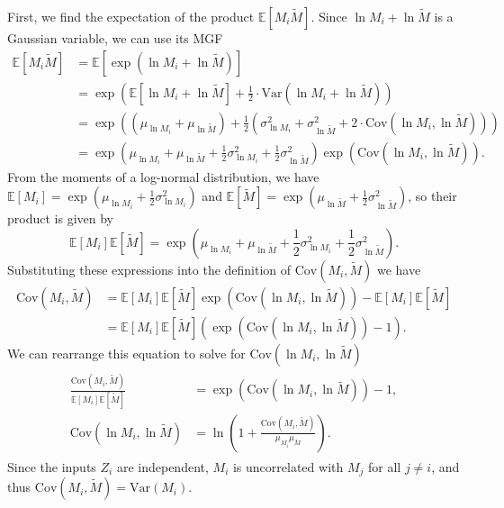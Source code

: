 \documentclass{uai2026} %
\begin{document}
First, we find the expectation of the product $\mathbb{E}[M_i \tilde{M}]$. Since $\ln M_i + \ln \tilde{M}$ is a Gaussian variable, we can use its MGF
\begin{align*}
\mathbb{E}[M_i \tilde{M}] &= \mathbb{E}[\exp(\ln M_i + \ln \tilde{M})] \\
&= \exp\left(\mathbb{E}[\ln M_i + \ln \tilde{M}] + \frac{1}{2} \cdot \text{Var}(\ln M_i + \ln \tilde{M})\right) \\
&= \exp\left((\mu_{\ln M_i} + \mu_{\ln \tilde{M}}) + \frac{1}{2}(\sigma_{\ln M_i}^2 + \sigma_{\ln \tilde{M}}^2 + 2\cdot \text{Cov}(\ln M_i, \ln \tilde{M}))\right) \\
&= \exp\left(\mu_{\ln M_i} + \mu_{\ln \tilde{M}} + \frac{1}{2}\sigma_{\ln M_i}^2 + \frac{1}{2}\sigma_{\ln \tilde{M}}^2\right) \exp\left(\text{Cov}(\ln M_i, \ln \tilde{M})\right).
\end{align*}
From the moments of a log-normal distribution, we have $\mathbb{E}[M_i] = \exp(\mu_{\ln M_i} + \frac{1}{2}\sigma_{\ln M_i}^2)$ and $\mathbb{E}[\tilde{M}] = \exp(\mu_{\ln \tilde{M}} + \frac{1}{2}\sigma_{\ln \tilde{M}}^2)$, so their product is given by
$$
\mathbb{E}[M_i]\mathbb{E}[\tilde{M}] = \exp\left(\mu_{\ln M_i} + \mu_{\ln \tilde{M}} + \frac{1}{2}\sigma_{\ln M_i}^2 + \frac{1}{2}\sigma_{\ln \tilde{M}}^2\right).
$$
Substituting these expressions into the definition of $\text{Cov}(M_i, \tilde{M})$ we have
\begin{align*}
\text{Cov}(M_i, \tilde{M}) &= \mathbb{E}[M_i]\mathbb{E}[\tilde{M}] \exp\left(\text{Cov}(\ln M_i, \ln \tilde{M})\right) - \mathbb{E}[M_i]\mathbb{E}[\tilde{M}] \\
&= \mathbb{E}[M_i]\mathbb{E}[\tilde{M}] \left(\exp(\text{Cov}(\ln M_i, \ln \tilde{M})) - 1\right).
\end{align*}
We can rearrange this equation to solve for $\text{Cov}(\ln M_i, \ln \tilde{M})$
\begin{align}
\label{eq:final_cov_lnMi_lnMtilde}
\begin{split}
\frac{\text{Cov}(M_i, \tilde{M})}{\mathbb{E}[M_i]\mathbb{E}[\tilde{M}]} &= \exp(\text{Cov}(\ln M_i, \ln \tilde{M})) - 1, \\
\text{Cov}(\ln M_i, \ln \tilde{M}) &= \ln\left(1 + \frac{\text{Cov}(M_i, \tilde{M})}{\mu_{M_i}\mu_{\tilde{M}}}\right).
\end{split}
\end{align}
Since the inputs $Z_i$ are independent, $M_i$ is uncorrelated with $M_j$ for all $j \neq i$, and thus $\text{Cov}(M_i, \tilde{M}) = \text{Var}(M_i)$.
\end{document}
